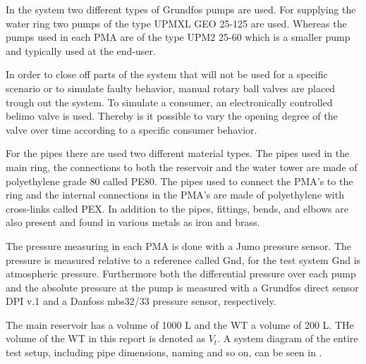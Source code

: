 In the system two different types of Grundfos pumps are used. For supplying the water ring two pumps of the type UPMXL GEO 25-125\cite{waterpump1} are used. Whereas the pumps used in each PMA are of the type UPM2 25-60\cite{waterpump2} which is a smaller pump and typically used at the end-user. 

In order to close off parts of the system that will not be used for a specific scenario or to simulate faulty behavior, manual rotary ball valves are placed trough out the system. 
To simulate a consumer, an electronically controlled belimo valve is used. Thereby is it possible to vary the opening degree of the valve over time according to a specific consumer behavior.   

For the pipes there are used two different material types. The pipes used in the main ring, the connections to both the reservoir and the water tower are made of polyethylene grade 80 called PE80\cite{PE100}. The pipes used to connect the PMA's to the ring and the internal connections in the PMA's are made of polyethylene with cross-links called PEX. In addition to the pipes, fittings, bends, and elbows are also present and found in various metals as iron and brass.     

The pressure measuring in each PMA is done with a Jumo pressure sensor. The pressure is measured relative to a reference called Gnd, for the test system Gnd is atmospheric pressure. Furthermore both the differential pressure over each pump and the absolute pressure at the pump is measured with a Grundfos direct sensor DPI v.1 and a Danfoss mbs32/33 pressure sensor, respectively.    

The main reservoir has a volume of 1000 L and the WT a volume of 200 L. THe volume of the WT in this report is denoted as $V_t$. A system diagram of the entire test setup, including pipe dimensions, naming and so on, can be seen in .

